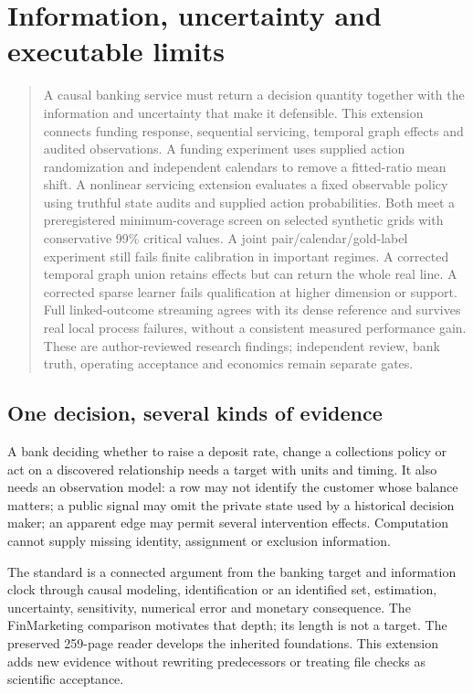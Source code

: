 \chapter{Information, uncertainty and executable limits}
\label{integrated:master_execution}

\begin{quote}\small
A causal banking service must return a decision quantity together with the information and uncertainty that make it defensible. This extension connects funding response, sequential servicing, temporal graph effects and audited observations. A funding experiment uses supplied action randomization and independent calendars to remove a fitted-ratio mean shift. A nonlinear servicing extension evaluates a fixed observable policy using truthful state audits and supplied action probabilities. Both meet a preregistered minimum-coverage screen on selected synthetic grids with conservative 99\% critical values. A joint pair/calendar/gold-label experiment still fails finite calibration in important regimes. A corrected temporal graph union retains effects but can return the whole real line. A corrected sparse learner fails qualification at higher dimension or support. Full linked-outcome streaming agrees with its dense reference and survives real local process failures, without a consistent measured performance gain. These are author-reviewed research findings; independent review, bank truth, operating acceptance and economics remain separate gates.
\end{quote}

\section{One decision, several kinds of evidence}
A bank deciding whether to raise a deposit rate, change a collections policy or act on a discovered relationship needs a target with units and timing. It also needs an observation model: a row may not identify the customer whose balance matters; a public signal may omit the private state used by a historical decision maker; an apparent edge may permit several intervention effects. Computation cannot supply missing identity, assignment or exclusion information.

The standard is a connected argument from the banking target and information clock through causal modeling, identification or an identified set, estimation, uncertainty, sensitivity, numerical error and monetary consequence. The FinMarketing comparison motivates that depth; its length is not a target. The preserved 259-page reader develops the inherited foundations. This extension adds new evidence without rewriting predecessors or treating file checks as scientific acceptance.

